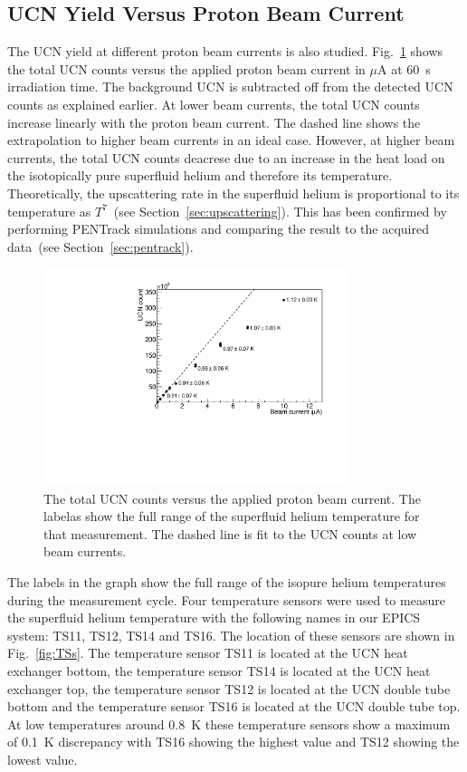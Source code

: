 \subsection{UCN Yield Versus Proton Beam Current}
The UCN yield at different proton beam currents is also
studied. Fig.~\ref{fig:counts_vs_beam} shows the total UCN counts
versus the applied proton beam current in $\mu$A at 60~s irradiation
time. The background UCN is subtracted off from the detected UCN
counts as explained earlier. At lower beam currents, the total UCN
counts increase linearly with the proton beam current. The dashed line
shows the extrapolation to higher beam currents in an ideal
case. However, at higher beam currents, the total UCN counts deacrese
due to an increase in the heat load on the isotopically pure
superfluid helium and therefore its temperature. Theoretically, the
upscattering rate in the superfluid helium is proportional to its
temperature as $T^7$~(see Section~\ref{sec:upscattering}). This has
been confirmed by performing PENTrack simulations and comparing the
result to the acquired data~(see Section~\ref{sec:pentrack}).



\begin{figure}[h!]
  \centering
  \includegraphics[width=0.8\textwidth]{UCNCounts_vs_Beam.pdf}
  \caption{The total UCN counts versus the applied proton beam
    current. The labelas show the full range of the superfluid helium
    temperature for that measurement. The dashed line is fit to the
    UCN counts at low beam currents.}
  \label{fig:counts_vs_beam}
\end{figure}


The labels in the graph show the full range of the isopure helium
temperatures during the measurement cycle. Four temperature sensors
were used to measure the superfluid helium temperature with the
following names in our EPICS system: TS11, TS12, TS14 and TS16. The
location of these sensors are shown in Fig.~\ref{fig:TSs}. The temperature
sensor TS11 is located at the UCN heat exchanger bottom, the
temperature sensor TS14 is located at the UCN heat exchanger top, the
temperature sensor TS12 is located at the UCN double tube bottom and
the temperature sensor TS16 is located at the UCN double tube top. At
low temperatures around 0.8~K these temperature sensors show a maximum
of 0.1~K discrepancy with TS16 showing the highest value and TS12
showing the lowest value.



